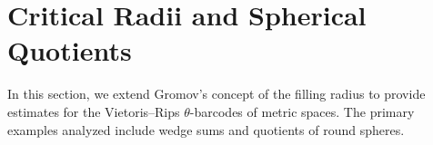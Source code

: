 
\section{Critical Radii and Spherical Quotients}\label{s:barcodes}

In this section, we extend Gromov's concept of the filling radius to provide estimates for the Vietoris--Rips \(\theta\)-barcodes of metric spaces.
The primary examples analyzed include wedge sums and quotients of round spheres.




